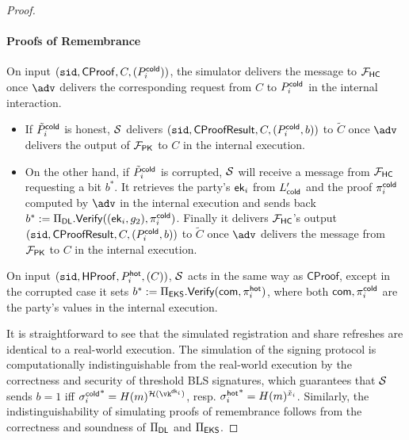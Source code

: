 \begin{proof}
\paragraph{Proofs of Remembrance}
On input $(\texttt{sid}, \mathsf{CProof}, C, (P_i^{\mathsf{cold}}))$, the simulator delivers the message to $\mathcal{F}_\mathsf{HC}$ once $\adv$ delivers the corresponding request from $C$ to $P_i^{\mathsf{cold}}$ in the internal interaction. 
\begin{itemize}
    \item If $\tilde{P}_i^{\mathsf{cold}}$ is honest, $\mathcal{S}$ delivers $(\texttt{sid}, \mathsf{CProofResult}, C,\allowbreak (P_i^{\mathsf{cold}}, b))$ to $\tilde{C}$ once $\adv$ delivers the output of $\mathcal{F}_\mathsf{PK}$ to $C$ in the internal execution. 
    \item On the other hand, if $\tilde{P}_i^{\mathsf{cold}}$ is corrupted, $\mathcal{S}$ will receive a message from $\mathcal{F}_\mathsf{HC}$ requesting a bit $b^*$. It retrieves the party's $\mathsf{ek}_i$ from $L_{\mathsf{cold}}'$ and the proof $\pi_i^{\mathsf{cold}}$ computed by $\adv$ in the internal execution and sends back $b^* := \Pi_{\sf DL}.\mathsf{Verify}((\mathsf{ek}_i,\allowbreak g_2), {\pi_i^{\mathsf{cold}}})$. Finally it delivers $\mathcal{F}_\mathsf{HC}$'s output $(\texttt{sid},\allowbreak \mathsf{CProofResult},\allowbreak C, (P_i^{\mathsf{cold}}, b))$ to $\tilde{C}$ once $\adv$ delivers the message from $\mathcal{F}_\mathsf{PK}$ to $C$ in the internal execution.
\end{itemize}
On input $(\texttt{sid}, \mathsf{HProof}, P_i^{\mathsf{hot}}, (C))$, $\mathcal{S}$ acts in the same way as $\mathsf{CProof}$, except in the corrupted case it sets $b^* := \Pi_{\sf EKS}.\mathsf{Verify}(\mathsf{com}, {\pi_i^{\mathsf{hot}}})$, where both $\mathsf{com}, \pi_i^{\mathsf{cold}}$ are the party's values in the internal execution.

It is straightforward to see that the simulated registration and share refreshes are identical to a real-world execution.
The simulation of the signing protocol is computationally indistinguishable from the real-world execution by the correctness and security of threshold BLS signatures, which guarantees that $\mathcal{S}$ sends $b=1$ iff ${\sigma_i^\cold}^* = \blshash(m)^{\lhlhash(\vk^{\dk_i})}$, resp. ${\sigma_i^{\mathsf{hot}}}^* = H(m)^{\tilde{x}_i}$. 
Similarly, the indistinguishability of simulating proofs of remembrance follows from the correctness and soundness of $\Pi_{\sf DL}$ and $\Pi_{\sf EKS}$.
\end{proof}

